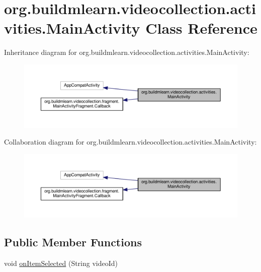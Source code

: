 \hypertarget{classorg_1_1buildmlearn_1_1videocollection_1_1activities_1_1MainActivity}{}\section{org.\+buildmlearn.\+videocollection.\+activities.\+Main\+Activity Class Reference}
\label{classorg_1_1buildmlearn_1_1videocollection_1_1activities_1_1MainActivity}


Inheritance diagram for org.\+buildmlearn.\+videocollection.\+activities.\+Main\+Activity\+:
\nopagebreak
\begin{figure}[H]
\begin{center}
\leavevmode
\includegraphics[width=350pt]{classorg_1_1buildmlearn_1_1videocollection_1_1activities_1_1MainActivity__inherit__graph}
\end{center}
\end{figure}


Collaboration diagram for org.\+buildmlearn.\+videocollection.\+activities.\+Main\+Activity\+:
\nopagebreak
\begin{figure}[H]
\begin{center}
\leavevmode
\includegraphics[width=350pt]{classorg_1_1buildmlearn_1_1videocollection_1_1activities_1_1MainActivity__coll__graph}
\end{center}
\end{figure}
\subsection*{Public Member Functions}
\begin{DoxyCompactItemize}
\item 
void \hyperlink{classorg_1_1buildmlearn_1_1videocollection_1_1activities_1_1MainActivity_a1a32ec9ebb95d0a643705813974f72d4}{on\+Item\+Selected} (String video\+Id)
\end{DoxyCompactItemize}
